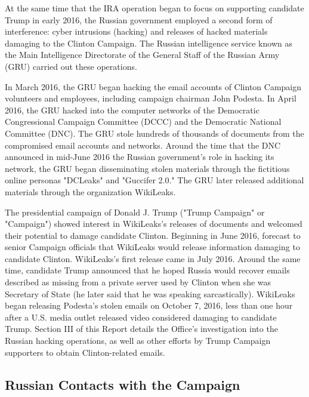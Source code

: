 \documentclass{article}
\begin{document}
At the same time that the IRA operation began to focus on supporting candidate Trump in early 2016, the Russian government employed a second form of interference: cyber intrusions (hacking) and releases of hacked materials damaging to the Clinton Campaign.
The Russian intelligence service known as the Main Intelligence Directorate of the General Staff of the Russian Army (GRU) carried out these operations.

In March 2016, the GRU began hacking the email accounts of Clinton Campaign volunteers and employees, including campaign chairman John Podesta.
In April 2016, the GRU hacked into the computer networks of the Democratic Congressional Campaign Committee (DCCC) and the Democratic National Committee (DNC).
The GRU stole hundreds of thousands of documents from the compromised email accounts and networks.
Around the time that the DNC announced in mid-June 2016 the Russian government's role in hacking its network, the GRU began disseminating stolen materials through the fictitious online personas "DCLeaks" and "Guccifer 2.0."
The GRU later released additional materials through the organization WikiLeaks.

The presidential campaign of Donald J. Trump ("Trump Campaign" or "Campaign") showed interest in WikiLeaks's releases of documents and welcomed their potential to damage candidate Clinton. Beginning in June 2016,  forecast to senior Campaign officials that WikiLeaks would release information damaging to candidate Clinton.
WikiLeaks's first release came in July 2016.
Around the same time, candidate Trump announced that he hoped Russia would recover emails described as missing from a private server used by Clinton when she was Secretary of State (he later said that he was speaking sarcastically).
 WikiLeaks began releasing Podesta's stolen emails on October 7, 2016, less than one hour after a U.S. media outlet released video considered damaging to candidate Trump.
Section III of this Report details the Office's investigation into the Russian hacking operations, as well as other efforts by Trump Campaign supporters to obtain Clinton-related emails.

\subsection{Russian Contacts with the Campaign}
\end{document}
